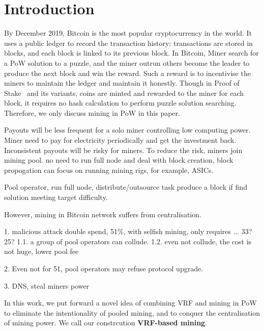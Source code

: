 \section{Introduction}

By December 2019, Bitcoin is the most popular cryptocurrency in the world.
It uses a public ledger to record the transaction history: transactions are stored in blocks, and each block is linked to its previous block.
In Bitcoin, Miner search for a PoW solution to a puzzle, and the miner outrun others become the leader to produce the next block and win the reward.
Such a reward is to incentivise the miners to maintain the ledger and maintain it honestly.
Though in Proof of Stake~\cite{} and its variants, coins are minted and rewarded to the miner for each block, it requires no hash calculation to perform puzzle solution searching.
Therefore, we only discuss mining in PoW in this paper.


Payouts will be less frequent for a solo miner controlling low computing power. Miner need to pay for electricity periodically and get the investment back.
Inconsistent payouts will be risky for miners.
To reduce the risk, miners join mining pool.
no need to run full node and deal with block creation, block propogation
can focus on running mining rigs, for example, ASICs.

Pool operator, run full node, distribute/outsource task
produce a block if find solution meeting target difficulty.

However, mining in Bitcoin network suffers from centralisation.




1. malicious attack
double spend, 51\%, with selfish mining, only requires ... 33?25?
1.1. a group of pool operators can collude.
1.2. even not collude, the cost is not huge, lower pool fee

2. Even not for 51, 
pool operators may refuse protocol upgrade. 


3. DNS, steal miners power


In this work, we put forward a novel idea of combining VRF and mining in PoW to eliminate the intentionality of pooled mining, and to conquer the centralisation of mining power. We call our constrcution \textbf{VRF-based mining}.